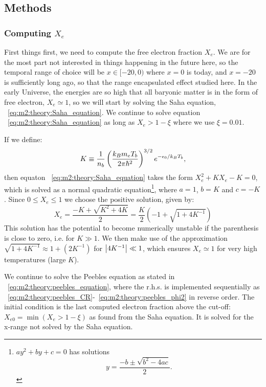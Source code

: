 \subsection{Methods}\label{sec:m2:methods}

\subsubsection{Computing $X_e$}\label{sec:m2:methods:electron_fraction}
    First things first, we need to compute the free electron fraction $X_e$. We are for the most part not interested in things happening in the future here, so the temporal range of choice will be $x\in[-20,0)$ where $x=0$ is today, and $x=-20$ is sufficiently long ago, so that the range encapsulated effect studied here. In the early Universe, the energies are so high that all baryonic matter is in the form of free electron, $X_e\simeq1$, so we will start by solving the Saha equation, ~\cref{eq:m2:theory:Saha_equation}. We continue to solve equation ~\cref{eq:m2:theory:Saha_equation} as long as $X_e>1-\xi$ where we use $\xi=0.01$.

    If we define:
    \begin{equation}
        K \equiv \frac{1}{n_b}\left(\frac{k_Bm_eT_b}{2\pi\hbar^2}\right)^{3/2}e^{-\epsilon_0/k_BT_b},
    \end{equation}
    then equaton ~\cref{eq:m2:theory:Saha_equation} takes the form $X_e^2 + KX_e - K = 0$, which is solved as a normal quadratic equation\footnote{$ay^2+by+c=0$ has solutions $$y=\frac{-b\pm\sqrt{b^2-4ac}}{2}.$$}, where $a=1$, $b=K$ and $c=-K$. Since $0\leq X_e\leq1$ we choose the positive solution, given by:
    \begin{equation}\label{eq:m2:methods:sqrt_approx}
        X_e = \frac{-K+\sqrt{K^2+4K}}{2} = \frac{K}{2}\left(-1+\sqrt{1+4K^{-1}}\right)
    \end{equation}
    This solution has the potential to become numerically unstable if the parenthesis is close to zero, i.e. for $K\gg1$. We then make use of the approximation $\sqrt{1+4K^{-1}} \approx 1+(2K^{-1})$ for $\abs{4K^{-1}}\ll1$, which ensures $X_e\simeq1$ for very high temperatures (large $K$).


    We continue to solve the Peebles equation as stated in ~\cref{eq:m2:theory:peebles_equation}, where the r.h.s. is implemented sequentially as ~\cref{eq:m2:theory:peebles_CR}-~\cref{eq:m2:theory:peebles_phi2} in reverse order. The initial condition is the last computed electron fraction above the cut-off: $X_{e0}=\min(X_e>1-\xi)$ as found from the Saha equation. It is solved for the x-range not solved by the Saha equation. 

